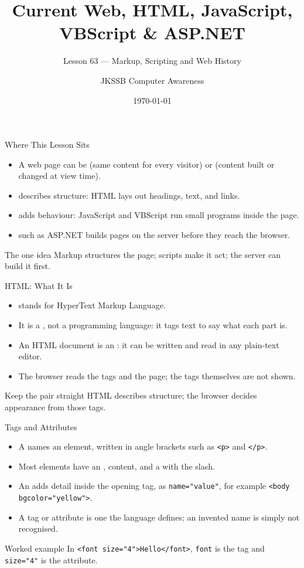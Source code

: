 \documentclass[aspectratio=169]{beamer}
\title{Current Web, HTML, JavaScript, VBScript \& ASP.NET}
\subtitle{Lesson 63 --- Markup, Scripting and Web History}
\author{JKSSB Computer Awareness}
\date{\today}
\begin{document}
\frame{\titlepage}

\begin{frame}{Where This Lesson Sits}
  \begin{itemize}
    \item A web page can be  (same content for every visitor) or
       (content built or changed at view time).
    \item {} describes structure: HTML lays out headings, text, and links.
    \item {} adds behaviour: JavaScript and VBScript run small
      programs inside the page.
    \item {} such as ASP.NET builds pages on the server
      before they reach the browser.
  \end{itemize}
  \begin{block}{The one idea}
    Markup structures the page; scripts make it act; the server can build it first.
  \end{block}
\end{frame}

\begin{frame}{HTML: What It Is}
  \begin{itemize}
    \item {} stands for HyperText Markup Language.
    \item It is a , not a programming language: it tags
      text to say what each part is.
    \item An HTML document is an : it can be written
      and read in any plain-text editor.
    \item The browser reads the tags and  the page; the tags
      themselves are not shown.
  \end{itemize}
  \begin{block}{Keep the pair straight}
    HTML describes structure; the browser decides appearance from those tags.
  \end{block}
\end{frame}

\begin{frame}{Tags and Attributes}
  \begin{itemize}
    \item A  names an element, written in angle brackets such as
      \texttt{<p>} and \texttt{</p>}.
    \item Most elements have an , content, and a
       with the slash.
    \item An  adds detail inside the opening tag, as
      \texttt{name="value"}, for example \texttt{<body bgcolor="yellow">}.
    \item A  tag or attribute is one the language defines; an
      invented name is simply not recognised.
  \end{itemize}
  \begin{exampleblock}{Worked example}
    In \texttt{<font size="4">Hello</font>}, \texttt{font} is the tag and
    \texttt{size="4"} is the attribute.
  \end{exampleblock}
\end{frame}
\end{document}
